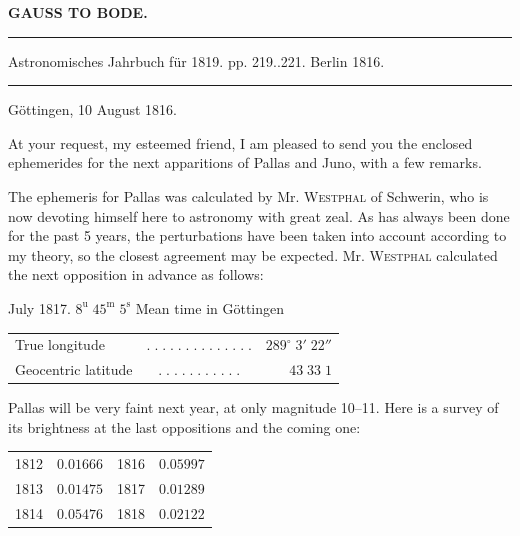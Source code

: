\clearpage{}
\begin{center}\textbf{GAUSS TO BODE.}\par\vspace{4pt}\hrule\vspace{4pt}\fontsize{10}{12}\selectfont Astronomisches Jahrbuch für 1819. pp. 219..221. Berlin 1816.\par\vspace{4pt}\hrule\vspace{4pt}\end{center}
\begin{flushright}Göttingen, 10 August 1816.\end{flushright}

\par\indent At your request, my esteemed friend, I am pleased to send you the enclosed ephemerides for the next apparitions of Pallas and Juno, with a few remarks.

\par\indent The ephemeris for Pallas was calculated by Mr. \textsc{Westphal} of Schwerin, who is now devoting himself here to astronomy with great zeal. As has always been done for the past 5 years, the perturbations have been taken into account according to my theory, so the closest agreement may be expected. Mr. \textsc{Westphal} calculated the next opposition in advance as follows:
\begin{center}\fontsize{10}{12} July 1817. $8^{\mathrm u}\;45^{\mathrm m}\;5^{\mathrm s}$ Mean time in Göttingen\par
\setlength{\tabcolsep}{3pt}\begin{tabular}{lcr}
True longitude & $.\;.\;.\;.\;.\;.\;.\;.\;.\;.\;.\;.\;.\;.$ & $289^\circ\;3'\;22''$\\
Geocentric latitude & $.\;.\;.\;.\;.\;.\;.\;.\;.\;.\;.$ & $43\;33\;1$\\
\end{tabular}\end{center}

\par\indent Pallas will be very faint next year, at only magnitude 10–11. Here is a survey of its brightness at the last oppositions and the coming one:
\begin{center}\fontsize{10}{12}\selectfont\setlength{\tabcolsep}{11pt}\begin{tabular}{lr|lr}
1812 & $0.01666$ & 1816 & $0.05997$\\
1813 & $0.01475$ & 1817 & $0.01289$\\
1814 & $0.05476$ & 1818 & $0.02122$\\
\end{tabular}\end{center}

